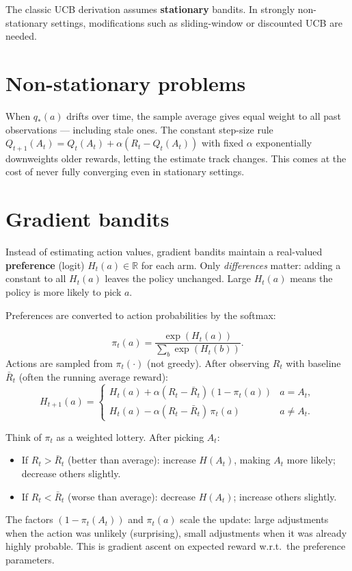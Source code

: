 \documentclass[11pt, oneside]{book}
\newcommand{\R}{\mathbb{R}}
\newcommand{\qtrue}{q_{*}}            %
\begin{document}
The classic UCB derivation assumes \textbf{stationary} bandits. In strongly
non-stationary settings, modifications such as sliding-window or discounted
UCB are needed.

\section{Non-stationary problems}

When $\qtrue(a)$ drifts over time, the sample average gives equal weight to
all past observations --- including stale ones. The constant step-size rule
$Q_{t+1}(A_t) = Q_t(A_t) + \alpha(R_t - Q_t(A_t))$ with fixed $\alpha$
exponentially downweights older rewards, letting the estimate track changes.
This comes at the cost of never fully converging even in stationary settings.

\section{Gradient bandits}

\begin{defbox}[title={Preference Parameters}]
Instead of estimating action values, gradient bandits maintain a real-valued
\textbf{preference} (logit) $H_t(a) \in \R$ for each arm. Only
\emph{differences} matter: adding a constant to all $H_t(a)$ leaves the
policy unchanged. Large $H_t(a)$ means the policy is more likely to pick $a$.
\end{defbox}

Preferences are converted to action probabilities by the softmax:

\begin{thmbox}[title={Softmax Policy and Gradient Update}]
\[
  \pi_t(a) = \frac{\exp(H_t(a))}{\sum_b \exp(H_t(b))}.
\]
Actions are sampled from $\pi_t(\cdot)$ (not greedy). After observing
$R_t$ with baseline $\bar{R}_t$ (often the running average reward):
\[
  H_{t+1}(a) =
  \begin{cases}
    H_t(a) + \alpha(R_t - \bar{R}_t)(1 - \pi_t(a)) & a = A_t, \\[4pt]
    H_t(a) - \alpha(R_t - \bar{R}_t)\,\pi_t(a) & a \ne A_t.
  \end{cases}
\]
\end{thmbox}

\begin{intbox}[title={What the Gradient Update Is Doing}]
Think of $\pi_t$ as a weighted lottery. After picking $A_t$:
\begin{itemize}
  \item If $R_t > \bar{R}_t$ (better than average): increase $H(A_t)$, making
    $A_t$ more likely; decrease others slightly.
  \item If $R_t < \bar{R}_t$ (worse than average): decrease $H(A_t)$;
    increase others slightly.
\end{itemize}
The factors $(1 - \pi_t(A_t))$ and $\pi_t(a)$ scale the update: large
adjustments when the action was unlikely (surprising), small adjustments when
it was already highly probable. This is gradient ascent on expected reward
w.r.t.\ the preference parameters.
\end{intbox}
\end{document}

